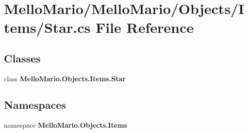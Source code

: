 \section{Mello\+Mario/\+Mello\+Mario/\+Objects/\+Items/\+Star.cs File Reference}
\label{Star_8cs}
\subsection*{Classes}
\begin{DoxyCompactItemize}
\item 
class \textbf{ Mello\+Mario.\+Objects.\+Items.\+Star}
\end{DoxyCompactItemize}
\subsection*{Namespaces}
\begin{DoxyCompactItemize}
\item 
namespace \textbf{ Mello\+Mario.\+Objects.\+Items}
\end{DoxyCompactItemize}
